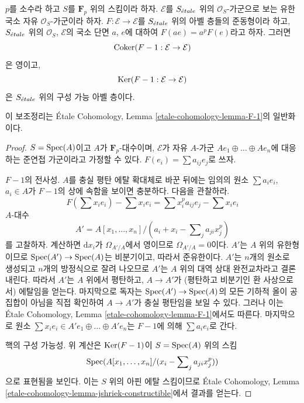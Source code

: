\begin{lemma}
\label{lemma-frobenius-linear-on-vb}
$p$를 소수라 하고 $S$를 $\mathbf{F}_p$ 위의 스킴이라 하자.
$\mathcal{E}$를 $S_{\acute{e}tale}$ 위의 $\mathcal{O}_S$-가군으로 보는
유한 국소 자유 $\mathcal{O}_S$-가군이라 하자.
$F : \mathcal{E} \to \mathcal{E}$를 $S_{\acute{e}tale}$ 위의 아벨 층들의
준동형이라 하고, $S_{\acute{e}tale}$ 위의 $\mathcal{O}_S$, $\mathcal{E}$의
국소 단면 $a$, $e$에 대하여 $F(a e) = a^pF(e)$라고 하자.
그러면
$$
\mathop{\mathrm{Coker}}(F - 1 : \mathcal{E} \to \mathcal{E})
$$
은 영이고,
$$
\mathop{\mathrm{Ker}}(F - 1 : \mathcal{E} \to \mathcal{E})
$$
은 $S_{\acute{e}tale}$ 위의 구성 가능 아벨 층이다.
\end{lemma}

\noindent
이 보조정리는 \'Etale Cohomology, Lemma
\ref{etale-cohomology-lemma-F-1}의 일반화이다.

\begin{proof}
$S = \mathop{\mathrm{Spec}}(A)$이고 $A$가 $\mathbf{F}_p$-대수이며,
$\mathcal{E}$가 자유 $A$-가군
$Ae_1 \oplus \ldots \oplus Ae_n$에 대응하는 준연접 가군이라고
가정할 수 있다. $F(e_i) = \sum a_{ij} e_j$로 쓰자.

\medskip\noindent
$F - 1$의 전사성. $A$를 충실 평탄 에탈 확대체로 바꾼 뒤에는 임의의
원소 $\sum a_i e_i$, $a_i \in A$가 $F - 1$의 상에 속함을 보이면
충분하다. 다음을 관찰하라.
$$
F(\sum x_ie_i) - \sum x_i e_i = \sum x_i^p a_{ij} e_j - \sum x_i e_i
$$
$A$-대수
$$
A' = A[x_1, \ldots, x_n]/(a_i + x_i - \sum\nolimits_j a_{ji} x_j^p)
$$
를 고찰하자. 계산하면 $\text{d}x_i$가 $\Omega_{A'/A}$에서 영이므로
$\Omega_{A'/A} = 0$이다. $A'$는 $A$ 위의 유한형이므로
$\mathop{\mathrm{Spec}}(A') \to \mathop{\mathrm{Spec}}(A)$는 비분기이고, 따라서 준유한이다.
$A'$는 $n$개의 원소로 생성되고 $n$개의 방정식으로 잘려 나오므로
$A'$는 $A$ 위의 대역 상대 완전교차라고 결론 내린다.
따라서 $A'$는 $A$ 위에서 평탄하고,
$A \to A'$가 (평탄하고 비분기인 환 사상으로서) 에탈임을 얻는다.
마지막으로 독자는
$\mathop{\mathrm{Spec}}(A') \to \mathop{\mathrm{Spec}}(A)$의 모든 기하적 올이 공집합이 아님을 직접
확인하여 $A \to A'$가 충실 평탄임을 보일 수 있다. 그러나 이는
\'Etale Cohomology, Lemma
\ref{etale-cohomology-lemma-F-1}에서도 따른다.
마지막으로 원소
$\sum x_i e_i \in A'e_1 \oplus \ldots \oplus A'e_n$는 $F - 1$에 의해
$\sum a_i e_i$로 간다.

\medskip\noindent
핵의 구성 가능성. 위 계산은 $\mathop{\mathrm{Ker}}(F - 1)$이 $S = \mathop{\mathrm{Spec}}(A)$ 위의 스킴
$$
\mathop{\mathrm{Spec}}(A[x_1, \ldots, x_n]/(x_i - \sum\nolimits_j a_{ji} x_j^p))
$$
으로 표현됨을 보인다. 이는 $S$ 위의 아핀 에탈 스킴이므로
\'Etale Cohomology, Lemma
\ref{etale-cohomology-lemma-jshriek-constructible}에서 결과를 얻는다.
\end{proof}


